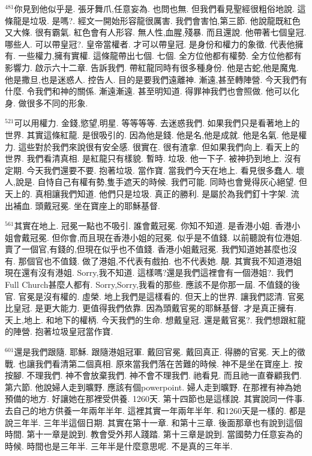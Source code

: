 \documentclass{book}
\begin{document}
$^{481}$你見到他似乎是.
張牙舞爪,任意妄為.
也問也無.
但我們看見聖經很粗俗地說.
這條龍是垃圾.
是嗎?.
經文一開始形容龍很厲害.
我們會害怕,第三節.
他說龍既紅色又大條.
很有霸氣.
紅色會有人形容.
無人性,血腥,殘暴.
而且還說.
他帶著七個皇冠.
哪些人.
可以帶皇冠?.
皇帝當權者.
才可以帶皇冠.
是身份和權力的象徵.
代表他擁有.
一些權力,擁有實權.
這條龍帶出七個.
七個.
全方位他都有權勢.
全方位他都有影響力.
啟示六十二章.
告訴我們.
帶紅龍同時有很多種身份.
他是古蛇,他是魔鬼.
他是撒旦,也是迷惑人.
控告人.
目的是要我們遠離神.
漸遠,甚至轉陣營.
今天我們有什麼.
令我們和神的關係.
漸遠漸遠.
甚至明知道.
得罪神我們也會照做.
他可以化身.
做很多不同的形象.

$^{521}$可以用權力.
金錢,慾望,明星.
等等等等.
去迷惑我們.
如果我們只是看著地上的世界.
其實這條紅龍.
是很吸引的.
因為他是錢.
他是名,他是成就.
他是名氣.
他是權力.
這些對於我們來說很有安全感.
很實在.
很有渣拿.
但如果我們向上.
看天上的世界.
我們看清真相.
是紅龍只有樣貌.
暫時.
垃圾.
他一下子.
被神扔到地上.
沒有定期.
今天我們還要不要.
抱著垃圾.
當作寶.
當我們今天在地上.
看見很多蠢人.
壞人,說是.
自恃自己有權有勢,隻手遮天的時候.
我們可能.
同時也會覺得灰心絕望.
但天上的.
真相讓我們知道.
他們只是垃圾.
真正的勝利.
是屬於為我們釘十字架.
流出補血.
頭戴冠冕.
坐在寶座上的耶穌基督.

$^{561}$其實在地上.
冠冕一點也不吸引.
誰會戴冠冕.
你知不知道.
是香港小姐.
香港小姐會戴冠冕.
但你會,而且現在香港小姐的冠冕.
似乎是不值錢.
以前聽說有位港姐.
賣了一個官,有錢的,但現在似乎也不值錢.
香港小姐戴冠冕.
我們知道她甚麼也沒有.
那個官也不值錢.
做了港姐,不代表有戲拍.
也不代表她.
靚.
其實我不知道港姐現在還有沒有港姐.
Sorry,我不知道.
這樣嗎?還是我們這裡會有一個港姐?.
我們Full Church甚麼人都有.
Sorry,Sorry,我看的那些.
應該不是你那一屆.
不值錢的後官.
官冕是沒有權的.
虛榮.
地上我們是這樣看的.
但天上的世界.
讓我們認清.
官冕比皇冠.
是更大能力.
更值得我們依靠.
因為頭戴官冕的耶穌基督.
才是真正擁有.
天上,地上.
和地下的權柄.
今天我們的生命.
想戴皇冠.
還是戴官冕?.
我們想跟紅龍的陣營.
抱著垃圾皇冠當作寶.

$^{601}$還是我們跟隨.
耶穌.
跟隨港姐冠軍.
戴回官冕.
戴回真正.
得勝的官冕.
天上的徵戰.
也讓我們看清第二個真相.
原來當我們落在苦難的時候.
神不是坐在寶座上.
按按腳.
不理我們.
神不會放棄我們.
神不會不理我們.
祂看見.
而且祂一直眷顧我們.
第六節.
他說婦人走到曠野.
應該有個powerpoint.
婦人走到曠野.
在那裡有神為她預備的地方.
好讓她在那裡受供養.
1260天.
第十四節也是這樣說.
其實說同一件事.
去自己的地方供養一年兩年半年.
這裡其實一年兩年半年.
和1260天是一樣的.
都是說三年半.
三年半這個日期.
其實在第十一章.
和第十三章.
後面那章也有說到這個時間.
第十一章是說到.
教會受外邦人踐踏.
第十三章是說到.
當國勢力任意妄為的時候.
時間也是三年半.
三年半是什麼意思呢.
不是真的三年半.
\end{document}
